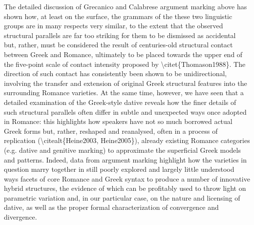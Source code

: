\documentclass[12pt]{article}
\newenvironment{styleStandard}{\setlength\leftskip{0cm}\setlength\rightskip{0cm plus 1fil}\setlength\parindent{0cm}\setlength\parfillskip{0pt plus 1fil}\setlength\parskip{0cm plus 1pt}\writerlistparindent\writerlistleftskip\leavevmode\normalfont\normalsize\writerlistlabel\ignorespaces}{\unskip\vspace{0cm plus 1pt}\par}
\newcommand\writerlistleftskip{}
\newcommand\writerlistparindent{}
\newcommand\writerlistlabel{}
\begin{document}
\begin{styleStandard}
The detailed discussion of Grecanico and Calabrese argument marking above has shown how, at least on the surface, the grammars of the these two linguistic groups are in many respects very similar, to the extent that the observed structural parallels are far too striking for them to be dismissed as accidental but, rather, must be considered the result of centuries-old structural contact between Greek and Romance, ultimately to be placed towards the upper end of the five-point scale of contact intensity proposed by {\textbackslash}citet\{Thomason1988\}. The direction of such contact has consistently been shown to be unidirectional, involving the transfer and extension of original Greek structural features into the surrounding Romance varieties. At the same time, however, we have seen that a detailed examination of the Greek-style dative reveals how the finer details of such structural parallels often differ in subtle and unexpected ways once adopted in Romance: this highlights how speakers have not so much borrowed actual Greek forms but, rather, reshaped and reanalysed, often in a process of replication ({\textbackslash}citealt\{Heine2003, Heine2005\}), already existing Romance categories (e.g. dative and genitive marking) to approximate the superficial Greek models and patterns. Indeed, data from argument marking highlight how the varieties in question marry together in still poorly explored and largely little understood ways facets of core Romance and Greek syntax to produce a number of innovative hybrid structures, the evidence of which can be profitably used to throw light on parametric variation and, in our particular case, on the nature and licensing of dative, as well as the proper formal characterization of convergence and divergence. 
\end{styleStandard}
\end{document}
